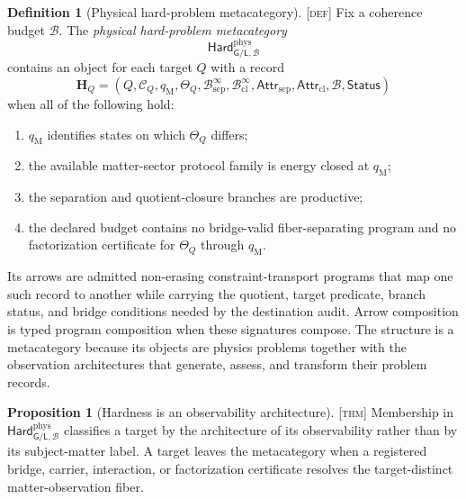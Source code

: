 \documentclass[11pt]{article}
\newcommand{\GOp}{\ensuremath{\mathsf{G}}}
\newcommand{\LOp}{\ensuremath{\mathsf{L}}}
\newcommand{\Defn}{\textsc{[def]}}
\newcommand{\Thm}{\textsc{[thm]}}
\theoremstyle{definition}
\newtheorem{sdefinition}{Definition}
\newtheorem{sproposition}{Proposition}
\begin{document}
\begin{sdefinition}[Physical hard-problem metacategory]
\label{def:physical-hard-metacategory}
\Defn{} Fix a coherence budget $\mathcal B$. The \emph{physical hard-problem
metacategory}
\begin{equation}
\mathsf{Hard}^{\mathrm{phys}}_{\GOp/\LOp,\mathcal B}
\label{eq:physical-hard-metacategory}
\end{equation}
contains an object for each target $Q$ with a record
\begin{equation}
\mathbf H_Q=
\left(
Q,\mathcal C_Q,q_{\mathrm M},\Theta_Q,
\mathcal B^{\infty}_{\mathrm{sep}},
\mathcal B^{\infty}_{\mathrm{cl}},
\mathsf{Attr}_{\mathrm{sep}},
\mathsf{Attr}_{\mathrm{cl}},
\mathcal B,\mathsf{Status}
\right)
\label{eq:hard-problem-object}
\end{equation}
when all of the following hold:
\begin{enumerate}[label=(\roman*)]
\item $q_{\mathrm M}$ identifies states on which $\Theta_Q$ differs;
\item the available matter-sector protocol family is energy closed at
      $q_{\mathrm M}$;
\item the separation and quotient-closure branches are productive;
\item the declared budget contains no bridge-valid fiber-separating program and
      no factorization certificate for $\Theta_Q$ through $q_{\mathrm M}$.
\end{enumerate}

Its arrows are admitted non-erasing constraint-transport programs that map one
such record to another while carrying the quotient, target predicate, branch
status, and bridge conditions needed by the destination audit. Arrow composition
is typed program composition when these signatures compose. The structure is a
metacategory because its objects are physics problems together with the
observation architectures that generate, assess, and transform their problem
records.
\end{sdefinition}

\begin{sproposition}[Hardness is an observability architecture]
\label{prop:hardness-observability}
\Thm{} Membership in
$\mathsf{Hard}^{\mathrm{phys}}_{\GOp/\LOp,\mathcal B}$ classifies a target by the
architecture of its observability rather than by its subject-matter label. A target
leaves the metacategory when a registered bridge, carrier, interaction, or
factorization certificate resolves the target-distinct matter-observation fiber.
\end{sproposition}
\end{document}
